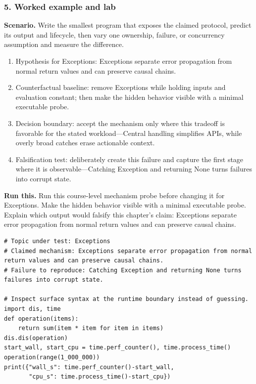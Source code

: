 \subsubsection*{5. Worked example and lab}
\textbf{Scenario.} Write the smallest program that exposes the claimed protocol, predict its output and lifecycle, then vary one ownership, failure, or concurrency assumption and measure the difference.
\begin{enumerate}
\item Hypothesis for Exceptions: Exceptions separate error propagation from normal return values and can preserve causal chains.
\item Counterfactual baseline: remove Exceptions while holding inputs and evaluation constant; then make the hidden behavior visible with a minimal executable probe.
\item Decision boundary: accept the mechanism only where this tradeoff is favorable for the stated workload—Central handling simplifies APIs, while overly broad catches erase actionable context.
\item Falsification test: deliberately create this failure and capture the first stage where it is observable—Catching Exception and returning None turns failures into corrupt state.
\end{enumerate}
\textbf{Run this.} Run this course-level mechanism probe before changing it for Exceptions. Make the hidden behavior visible with a minimal executable probe. Explain which output would falsify this chapter's claim: Exceptions separate error propagation from normal return values and can preserve causal chains.
\begin{Verbatim}[fontsize=\scriptsize]
# Topic under test: Exceptions
# Claimed mechanism: Exceptions separate error propagation from normal return values and can preserve causal chains.
# Failure to reproduce: Catching Exception and returning None turns failures into corrupt state.

# Inspect surface syntax at the runtime boundary instead of guessing.
import dis, time
def operation(items):
    return sum(item * item for item in items)
dis.dis(operation)
start_wall, start_cpu = time.perf_counter(), time.process_time()
operation(range(1_000_000))
print({"wall_s": time.perf_counter()-start_wall,
       "cpu_s": time.process_time()-start_cpu})
\end{Verbatim}
